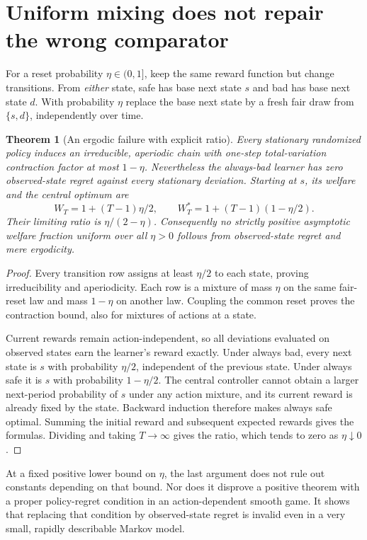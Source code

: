 \documentclass[11pt,a4paper]{article}
\newtheorem{theorem}{Theorem}[section]
\theoremstyle{definition}
\theoremstyle{remark}
\begin{document}
\section{Uniform mixing does not repair the wrong comparator}
For a reset probability $\eta\in(0,1]$, keep the same reward function but change transitions. From \emph{either} state, safe has base next state $s$ and bad has base next state $d$. With probability $\eta$ replace the base next state by a fresh fair draw from $\{s,d\}$, independently over time.
\begin{theorem}[An ergodic failure with explicit ratio]
Every stationary randomized policy induces an irreducible, aperiodic chain with one-step total-variation contraction factor at most $1-\eta$. Nevertheless the always-bad learner has zero observed-state regret against every stationary deviation. Starting at $s$, its welfare and the central optimum are
\[
 W_T=1+(T-1)\eta/2,\qquad
 W_T^*=1+(T-1)(1-\eta/2).
\]
Their limiting ratio is $\eta/(2-\eta)$. Consequently no strictly positive asymptotic welfare fraction uniform over all $\eta>0$ follows from observed-state regret and mere ergodicity.
\end{theorem}
\begin{proof}
Every transition row assigns at least $\eta/2$ to each state, proving irreducibility and aperiodicity. Each row is a mixture of mass $\eta$ on the same fair-reset law and mass $1-\eta$ on another law. Coupling the common reset proves the contraction bound, also for mixtures of actions at a state.

Current rewards remain action-independent, so all deviations evaluated on observed states earn the learner's reward exactly. Under always bad, every next state is $s$ with probability $\eta/2$, independent of the previous state. Under always safe it is $s$ with probability $1-\eta/2$. The central controller cannot obtain a larger next-period probability of $s$ under any action mixture, and its current reward is already fixed by the state. Backward induction therefore makes always safe optimal. Summing the initial reward and subsequent expected rewards gives the formulas. Dividing and taking $T\to\infty$ gives the ratio, which tends to zero as $\eta\downarrow0$.
\end{proof}
At a fixed positive lower bound on $\eta$, the last argument does not rule out constants depending on that bound. Nor does it disprove a positive theorem with a proper policy-regret condition in an action-dependent smooth game. It shows that replacing that condition by observed-state regret is invalid even in a very small, rapidly describable Markov model.
\end{document}
